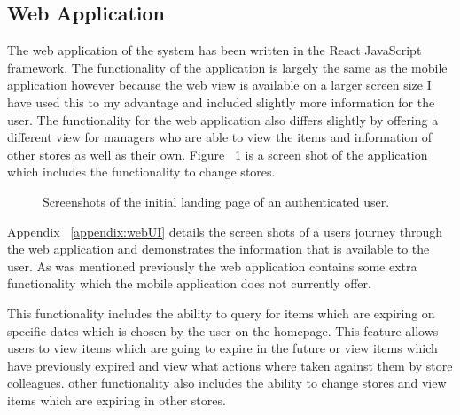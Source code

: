 \documentclass[a4paper,11pt]{report}
\begin{document}
\subsection{Web Application}
The web application of the system has been written in the React JavaScript framework. The functionality of the application is largely the same as the mobile application however because the web view is available on a larger screen size I have used this to my advantage and included slightly more information for the user. 
The functionality for the web application also differs slightly by offering a different view for managers who are able to view the items and information of other stores as well as their own. 
Figure ~\ref{fig:WebUi} is a screen shot of the application which includes the functionality to change stores.

\begin{figure}[H]
    \centering
    \caption{Screenshots of the initial landing page of an authenticated user.}
    \label{fig:WebUi}
\end{figure}

Appendix ~\ref{appendix:webUI} details the screen shots of a users journey through the web application and demonstrates the information that is available to the user.
As was mentioned previously the web application contains some extra functionality which the mobile application does not currently offer.

This functionality includes the ability to query for items which are expiring on specific dates which is chosen by the user on the homepage. This feature allows users to view items which are going to expire in the future or view items which have previously expired and view what actions where taken against them by store colleagues.
other functionality also includes the ability to change stores and view items which are expiring in other stores. 
\end{document}
